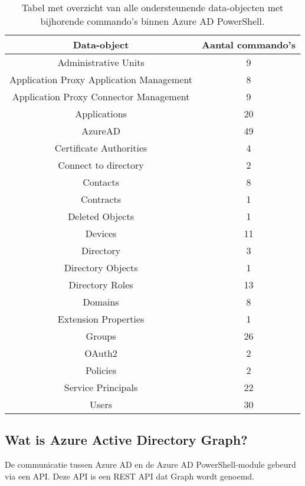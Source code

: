 \begin{table}
    \small
    \centering
    \begin{tabular}{ |c|c| } 
        \hline
        \textbf{Data-object} & \textbf{Aantal commando's} \\
        \hline
        Administrative Units & 9 \\ 
        Application Proxy Application Management & 8 \\ 
        Application Proxy Connector Management & 9 \\
        Applications & 20 \\ 
        AzureAD & 49 \\ 
        Certificate Authorities & 4 \\ 
        Connect to directory & 2 \\ 
        Contacts & 8 \\ 
        Contracts & 1 \\ 
        Deleted Objects & 1 \\ 
        Devices & 11 \\    
        Directory & 3 \\
        Directory Objects & 1 \\ 
        Directory Roles & 13 \\ 
        Domains & 8 \\ 
        Extension Properties & 1 \\ 
        Groups & 26 \\ 
        OAuth2 & 2 \\ 
        Policies & 2 \\ 
        Service Principals & 22 \\ 
        Users & 30 \\ 
        \hline
    \end{tabular}
    \caption[Tabel Azure AD data-objecten]{Tabel met overzicht van alle ondersteunende data-objecten met bijhorende commando's binnen Azure \ac{AD} PowerShell.}
    \label{AADT}
\end{table}

\subsection{Wat is Azure Active Directory Graph?}

De communicatie tussen Azure \ac{AD} en de Azure \ac{AD} PowerShell-module gebeurd via een \ac{API}. Deze \ac{API} is een \ac{REST} \ac{API} dat Graph wordt genoemd. \\ 

